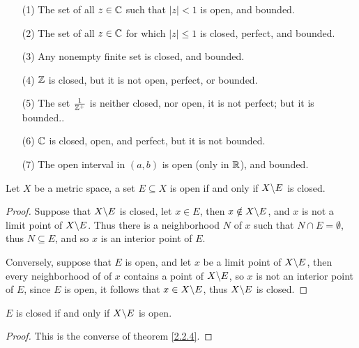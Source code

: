 \begin{example}
    \begin{enumerate}
        \item[(1)] The set of all $z \in \mathbb{C}$ such that $|z|<1$ is open, and bounded.

        \item[(2)] The set of all $z \in \mathbb{C}$ for which  $|z| \leq 1$ is closed, perfect, and bounded.

        \item[(3)] Any nonempty finite set is closed, and bounded.

        \item[(4)] $\mathbb{Z}$ is closed, but it is not open, perfect, or bounded.

        \item[(5)] The set  $ \frac{1}{\mathbb{Z}^+}$ is neither closed, nor open, it is not perfect; but it
            is bounded..

        \item[(6)] $\mathbb{C}$ is closed, open, and perfect, but it is not bounded.

        \itemp(7) The open interval in  $(a,b)$ is open (only in $\mathbb{R}$), and bounded.
    \end{enumerate}
\end{example}

\begin{theorem}\label{2.2.5}
    Let $X$ be a metric space, a set  $E \subseteq X$ is open if and only if  $X \backslash E$ is
    closed.
\end{theorem}
\begin{proof}
    Suppose that $X \backslash E$ is closed, let  $x \in E$, then  $x \notin X \backslash E$, and $x$ is
    not a limit point of  $X \backslash E$. Thus there is a neighborhood $N$ of  $x$ such
    that $N \cap E=\emptyset$, thus $N \subseteq E$, and so $x$ is an interior point of  $E$.

    Conversely, suppose that  $E$ is open, and let  $x$ be a limit point of  $X \backslash E$,
    then every neighborhood of of  $x$ contains a point of  $X \backslash E$, so  $x$ is not
    an interior point of  $E$, since  $E$ is open, it follows that  $x \in X \backslash E$, thus
    $X \backslash E$ is closed.
\end{proof}

\begin{corollary}
    $E$ is closed if and only if  $X \backslash E$ is open.
\end{corollary}
\begin{proof}
    This is the converse of theorem \ref{2.2.4}.
\end{proof}


